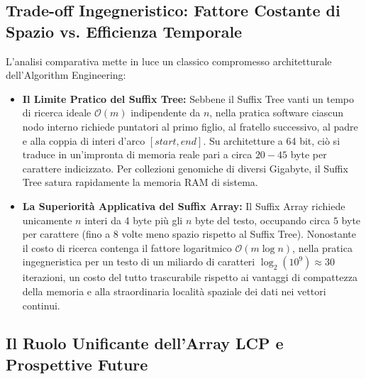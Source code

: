 \FloatBarrier
\subsection{Trade-off Ingegneristico: Fattore Costante di Spazio vs. Efficienza Temporale}
\label{subsec:trade-off-ingegneristico-spazio-tempo}

L'analisi comparativa mette in luce un classico compromesso architetturale dell'Algorithm Engineering:
\begin{itemize}
  \item \textbf{Il Limite Pratico del Suffix Tree:} Sebbene il Suffix Tree vanti un tempo di ricerca ideale $\mathcal{O}(m)$ indipendente da $n$, nella pratica software ciascun nodo interno richiede puntatori al primo figlio, al fratello successivo, al padre e alla coppia di interi d'arco $[start, end]$. Su architetture a 64 bit, ci\`o si traduce in un'impronta di memoria reale pari a circa $20-45$ byte per carattere indicizzato. Per collezioni genomiche di diversi Gigabyte, il Suffix Tree satura rapidamente la memoria RAM di sistema.
  \item \textbf{La Superiorit\`a Applicativa del Suffix Array:} Il Suffix Array richiede unicamente $n$ interi da 4 byte pi\`u gli $n$ byte del testo, occupando circa $5$ byte per carattere (fino a $8$ volte meno spazio rispetto al Suffix Tree). Nonostante il costo di ricerca contenga il fattore logaritmico $\mathcal{O}(m \log n)$, nella pratica ingegneristica per un testo di un miliardo di caratteri $\log_2(10^9) \approx 30$ iterazioni, un costo del tutto trascurabile rispetto ai vantaggi di compattezza della memoria e alla straordinaria localit\`a spaziale dei dati nei vettori continui.
\end{itemize}

\FloatBarrier
\subsection{Il Ruolo Unificante dell'Array LCP e Prospettive Future}
\label{subsec:ruolo-unificante-lcp}

